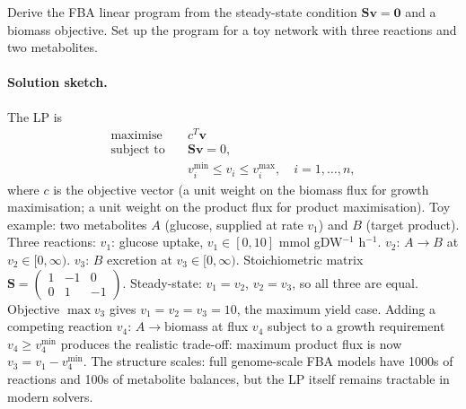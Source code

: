 \begin{exercise}
Derive the FBA linear program from the steady-state condition
$\mathbf{S}\mathbf{v} = \mathbf{0}$ and a biomass objective. Set up
the program for a toy network with three reactions and two
metabolites.

\paragraph{Solution sketch.}
The LP is
\begin{align*}
\text{maximise} & \quad c^{T} \mathbf{v} \\
\text{subject to} & \quad \mathbf{S} \mathbf{v} = 0, \\
& \quad v_{i}^{\min} \le v_{i} \le v_{i}^{\max}, \quad i = 1, \ldots, n,
\end{align*}
where $c$ is the objective vector (a unit weight on the biomass
flux for growth maximisation; a unit weight on the product flux
for product maximisation). Toy example: two metabolites $A$ (glucose,
supplied at rate $v_{1}$) and $B$ (target product). Three reactions:
$v_{1}$: glucose uptake, $v_{1} \in [0, 10]$ mmol gDW${}^{-1}$ h${}^{-1}$.
$v_{2}$: $A \to B$ at $v_{2} \in [0, \infty)$.
$v_{3}$: $B$ excretion at $v_{3} \in [0, \infty)$. Stoichiometric
matrix $\mathbf{S} = \begin{pmatrix}1 & -1 & 0 \\ 0 & 1 & -1\end{pmatrix}$.
Steady-state: $v_{1} = v_{2}$, $v_{2} = v_{3}$, so all three are
equal. Objective $\max v_{3}$ gives $v_{1} = v_{2} = v_{3} = 10$,
the maximum yield case. Adding a competing reaction $v_{4}$:
$A \to \text{biomass}$ at flux $v_{4}$ subject to a growth
requirement $v_{4} \ge v_{4}^{\min}$ produces the realistic
trade-off: maximum product flux is now
$v_{3} = v_{1} - v_{4}^{\min}$. The structure scales: full
genome-scale FBA models have 1000s of reactions and 100s of
metabolite balances, but the LP itself remains tractable in modern
solvers.
\end{exercise}

